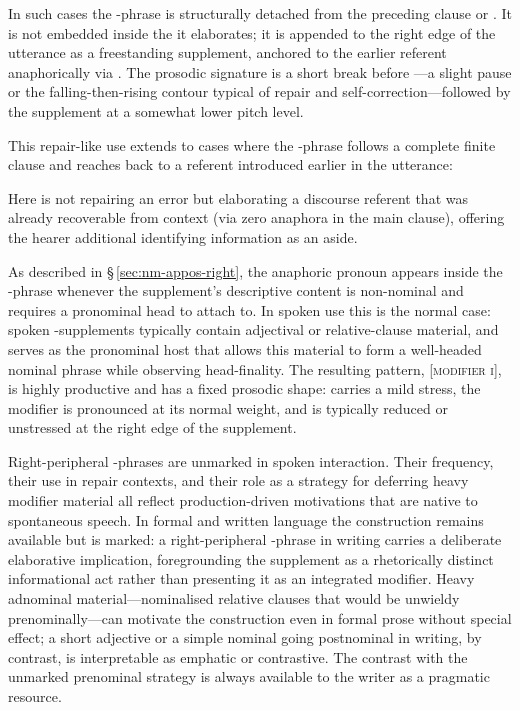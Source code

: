 \pex
{}
\xe


In such cases the -phrase is structurally detached from the
preceding clause or . It is not embedded inside the  it elaborates; it is
appended to the right edge of the utterance as a freestanding supplement,
anchored to the earlier referent anaphorically via . The prosodic
signature is a short break before ---a slight pause or the falling-then-rising
contour typical of repair and self-correction---followed by the supplement at
a somewhat lower pitch level.

This repair-like use extends to cases where the -phrase follows a
complete finite clause and reaches back to a referent introduced earlier in
the utterance:

\pex
\a {}
\xe

Here  is not repairing an error but elaborating a
discourse referent that was already recoverable from context (via zero
anaphora in the main clause), offering the hearer additional identifying
information as an aside.

As described in \S\,\ref{sec:nm-appos-right}, the anaphoric pronoun 
appears inside the -phrase whenever the supplement's descriptive content
is non-nominal and requires a pronominal head to attach to. In spoken use this
is the normal case: spoken -supplements typically contain adjectival or
relative-clause material, and  serves as the pronominal host that allows
this material to form a well-headed nominal phrase while observing
head-finality. The resulting pattern,  \textsc{[modifier i]}, is highly
productive and has a fixed prosodic shape:  carries a mild stress, the
modifier is pronounced at its normal weight, and  is typically reduced or
unstressed at the right edge of the supplement.

Right-peripheral -phrases are unmarked in spoken interaction. Their
frequency, their use in repair contexts, and their role as a strategy for
deferring heavy modifier material all reflect production-driven motivations that
are native to spontaneous speech. In formal and written language the
construction remains available but is marked: a right-peripheral -phrase
in writing carries a deliberate elaborative implication, foregrounding the
supplement as a rhetorically distinct informational act rather than presenting
it as an integrated modifier. Heavy adnominal material---nominalised relative
clauses that would be unwieldy prenominally---can motivate the construction even
in formal prose without special effect; a short adjective or a simple nominal
going postnominal in writing, by contrast, is interpretable as emphatic or
contrastive. The contrast with the unmarked prenominal strategy is always
available to the writer as a pragmatic resource.
